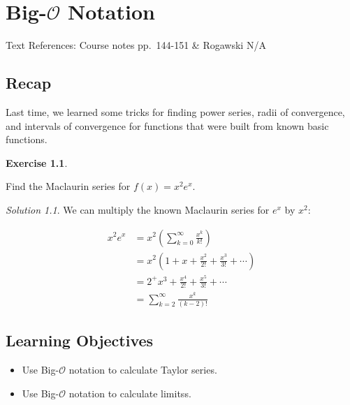 \documentclass[
]{book}
\providecommand{\tightlist}{%
  \setlength{\itemsep}{0pt}\setlength{\parskip}{0pt}}
\theoremstyle{definition}
\theoremstyle{definition}
\theoremstyle{definition}
\newtheorem{exercise}{Exercise}[chapter]
\theoremstyle{definition}
\theoremstyle{remark}
\newtheorem*{solution}{Solution}
\begin{document}
\hypertarget{lec-33}{%
\chapter{\texorpdfstring{Big-\(\mathcal{O}\) Notation}{Big-\textbackslash mathcal\{O\} Notation}}\label{lec-33}}

Text References: Course notes pp.~144-151 \& Rogawski N/A

\hypertarget{recap-31}{%
\section{Recap}\label{recap-31}}

Last time, we learned some tricks for finding power series, radii of convergence, and intervals of convergence for functions that were built from known basic functions.

\begin{exercise}
\protect\hypertarget{exr:unlabeled-div-252}{}\label{exr:unlabeled-div-252}

Find the Maclaurin series for \(f(x)=x^2e^x\).

\end{exercise}

\begin{solution}

We can multiply the known Maclaurin series for \(e^x\) by \(x^2\):

\begin{align*}
x^2e^x &= x^2 \left(\sum_{k=0}^\infty \frac{x^k}{k!} \right)\\
&= x^2\left ( 1+x+\frac{x^2}{2!}+\frac{x^3}{3!}+\cdots \right )\\
&= 2^+x^3+\frac{x^4}{2!}+\frac{x^5}{3!}+\cdots \\
&= \sum_{k=2}^\infty \frac{x^k}{(k-2)!}
\end{align*}

\end{solution}

\hypertarget{learning-objectives-32}{%
\section{Learning Objectives}\label{learning-objectives-32}}

\begin{itemize}
\tightlist
\item
  Use Big-\(\mathcal{O}\) notation to calculate Taylor series.
\item
  Use Big-\(\mathcal{O}\) notation to calculate limitss.
\end{itemize}
\end{document}
